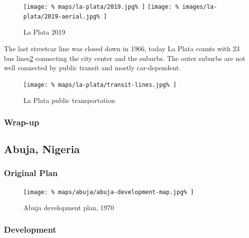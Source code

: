 \documentclass[twocolumn]{article}
\begin{document}
			\begin{figure}[h!]
				\texttt{[image: \%
					maps/la-plata/2019.jpg\%
				]}
				\texttt{[image: \%
					images/la-plata/2019-aerial.jpg\%
				]}
				\caption{La Plata 2019\cite{OpenStreetMap:LaPlata}}
				\label{fig:map:la-plata-2019}
			\end{figure}
			
			The last streetcar line was closed down in 1966, today La Plata counts with 23 bus lines\ref{fig:map:la-plata-transit} connecting the city center and the suburbs.
			The outer suburbs are not well connected by public transit and mostly car-dependent.
			
			\begin{figure}[h!]
				\texttt{[image: \%
					maps/la-plata/transit-lines.jpg\%
				]}
				\caption{La Plata public transportation\cite{OpenStreetMap:LaPlata}}
				\label{fig:map:la-plata-transit}
			\end{figure}
			
			
			
			\subsubsection{Wrap-up}
			
			
			
		\clearpage
		\begin{strip}
		\subsection{Abuja, Nigeria}
		\end{strip}
		
			
			
			\subsubsection{Original Plan}
			
			\begin{figure}[h!]
				\texttt{[image: \%
					maps/abuja/abuja-development-map.jpg\%
				]}
				\caption{Abuja development plan, 1970\cite{NairalandForum:AbujaMap}}
				\label{fig:map:abuja-development-plan}
			\end{figure}
			
			
			\subsubsection{Development}
			
\end{document}
